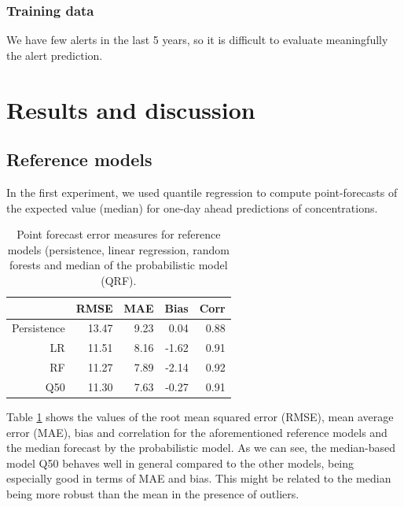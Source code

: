 \documentclass[a4paper,twocolumn,5p]{elsarticle}
\begin{document}
\subsubsection{Training data}
\label{sec:eval-extr-value}

We have few alerts in the last 5 years, so it is difficult to evaluate meaningfully the alert prediction.

\section{Results and discussion}
\label{sec:results}




\subsection{Reference models}
\label{sec:deterministic}

In the first experiment, we used quantile regression to compute
point-forecasts of the expected value (median) for one-day ahead
predictions of \no concentrations.

\begin{table}[tbp]
\caption{\label{tab:determ}Point forecast error measures for reference
models (persistence, linear regression, random forests and median of
the probabilistic model (QRF).}
  \centering
\begin{tabular}{rrrrr}
  \toprule
 & RMSE & MAE & Bias & Corr \\ 
  \midrule
  Persistence & 13.47 & 9.23 & 0.04 & 0.88 \\ 
  LR   & 11.51 & 8.16 & -1.62 & 0.91 \\ 
  RF   & 11.27 & 7.89 & -2.14 & 0.92 \\
  Q50  & 11.30 & 7.63 & -0.27 & 0.91 \\ 
   \bottomrule
\end{tabular}
\end{table}

Table \ref{tab:determ} shows the values of the root mean squared error
(RMSE), mean average error (MAE), bias and correlation for the
aforementioned reference models and the median forecast by the
probabilistic model. As we can see, the median-based model Q50 behaves
well in general compared to the other models, being especially good in
terms of MAE and bias. This might be related to the median being more
robust than the mean in the presence of outliers.
\end{document}
